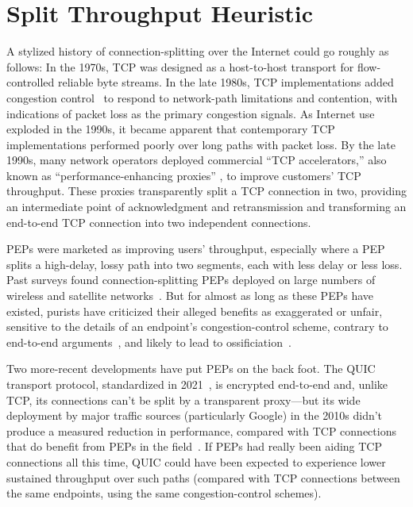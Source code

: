 \chapter{Split Throughput Heuristic}
\label{sec:splitting}



A stylized history of connection-splitting over the Internet could go
roughly as follows: In the 1970s, TCP was designed as a host-to-host
transport for flow-controlled reliable byte streams. In the late
1980s, TCP implementations added congestion control~\cite{vjk} to
respond to network-path limitations and contention, with indications
of packet loss as the primary congestion signals. As Internet use
exploded in the 1990s, it became apparent that contemporary TCP
implementations performed poorly over long paths with packet loss. By
the late 1990s, many network operators deployed commercial ``TCP
accelerators,'' also known as ``performance-enhancing proxies''
\cite{rfc3135, honda2011still}, to improve customers' TCP
throughput. These proxies transparently split a TCP connection in two,
providing an intermediate point of acknowledgment and retransmission
and transforming an end-to-end TCP connection into two independent
connections.

PEPs were marketed as improving users' throughput, especially where a
PEP splits a high-delay, lossy path into two segments, each with less
delay or less loss. Past surveys found connection-splitting PEPs
deployed on large numbers of wireless and satellite
networks~\cite{rfc3135, honda2011still}. But for almost as long as
these PEPs have existed, purists have criticized their alleged
benefits as exaggerated or unfair, sensitive to the details of an
endpoint's congestion-control scheme, contrary to end-to-end
arguments~\cite{saltzer1984endtoend}, and likely to lead to
ossificiation~\cite{papastergiou2017deossifying, edeline2019bottomup}.

Two more-recent developments have put PEPs on the back foot. The QUIC
transport protocol, standardized in 2021~\cite{rfc9000}, is encrypted
end-to-end and, unlike TCP, its connections can't be split by a
transparent proxy---but its wide deployment by major traffic sources (particularly Google)
in the 2010s didn't produce a measured reduction in performance,
compared with TCP connections that do benefit from PEPs in the
field~\cite{langley2017quic}. If PEPs had really been aiding TCP connections all this time,
QUIC could have been expected to experience lower sustained throughput
over such paths (compared with TCP connections between the same
endpoints, using the same congestion-control schemes).

